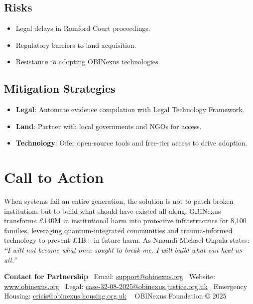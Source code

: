 \documentclass[12pt]{article}\usepackage[a4paper,margin=1in]{geometry}
\begin{document}
\subsection*{Risks}
\begin{itemize}
    \item Legal delays in Romford Court proceedings.
    \item Regulatory barriers to land acquisition.
    \item Resistance to adopting OBINexus technologies.
\end{itemize}\subsection*{Mitigation Strategies}
\begin{itemize}
    \item \textbf{Legal}: Automate evidence compilation with Legal Technology Framework.
    \item \textbf{Land}: Partner with local governments and NGOs for access.
    \item \textbf{Technology}: Offer open-source tools and free-tier access to drive adoption.
\end{itemize}\section*{Call to Action}
When systems fail an entire generation, the solution is not to patch broken institutions but to build what should have existed all along. OBINexus transforms £140M in institutional harm into protective infrastructure for 8,100 families, leveraging quantum-integrated communities and trauma-informed technology to prevent £1B+ in future harm. As Nnamdi Michael Okpala states: \textit{``I will not become what once sought to break me. I will build what can heal us all.''}\begin{center}
    \textbf{Contact for Partnership} \
    Email: \href{mailto:support@obinexus.org}{support@obinexus.org} \
    Website: \href{http://www.obinexus.org}{www.obinexus.org} \
    Legal: \href{mailto:case-32-08-2025@obinexus.justice.org.uk}{case-32-08-2025@obinexus.justice.org.uk} \
    Emergency Housing: \href{mailto:crisis@obinexus.housing.org.uk}{crisis@obinexus.housing.org.uk} \
    \vspace{0.5em}
    OBINexus Foundation © 2025
\end{center}
\end{document}
